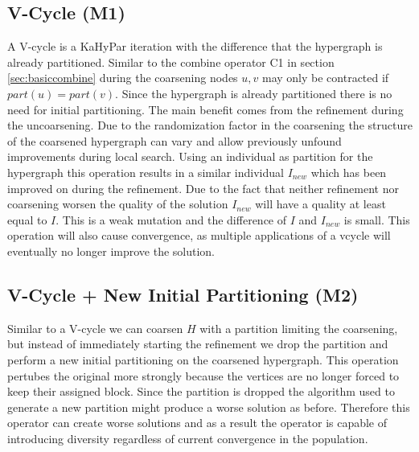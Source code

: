 \documentclass[a4paper,12pt,titlepage, BCOR7mm,headsepline]{scrbook}
\numberwithin{equation}{section}
\begin{document}
\subsection{V-Cycle (M1)}
A V-cycle is a KaHyPar iteration with the difference that the hypergraph is already partitioned. Similar to the combine operator C1 in section \ref{sec:basiccombine} during the coarsening nodes $u,v$ may only be contracted if $part(u) = part(v)$. Since the hypergraph is already partitioned there is no need for initial partitioning. The main benefit comes from the refinement during the uncoarsening. Due to the randomization factor in the coarsening the structure of the coarsened hypergraph can vary and allow previously unfound improvements during local search.
Using an individual as partition for the hypergraph this operation results in a similar individual $I_{new}$ which has been improved on during the refinement. Due to the fact that neither refinement nor coarsening worsen the quality of the solution $I_{new}$ will have a quality at least equal to $I$. This is a weak mutation and the difference of $I$ and $I_{new}$ is small. This operation will also cause convergence, as multiple applications of a vcycle will eventually no longer improve the solution.
\subsection{V-Cycle + New Initial Partitioning (M2)}
Similar to a V-cycle we can coarsen $H$ with a partition limiting the coarsening, but instead of immediately starting the refinement we drop the partition and perform a new initial partitioning on the coarsened hypergraph. This operation pertubes the original more strongly because the vertices are no longer forced to keep their assigned block. Since the partition is
dropped the algorithm used to generate a new partition might produce a worse solution as before. Therefore this operator can create worse solutions and as a result the operator is capable of introducing diversity regardless of current convergence in the population. 
\end{document}
